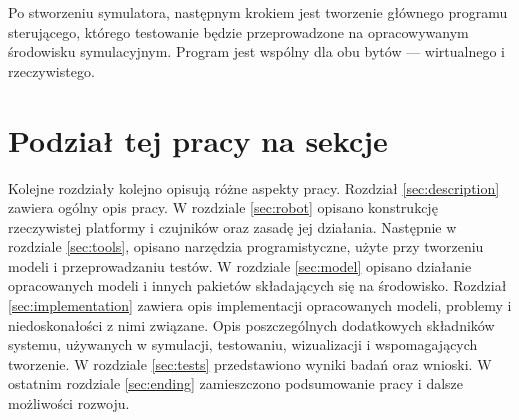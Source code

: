 	Po stworzeniu symulatora, następnym krokiem jest tworzenie głównego programu sterującego, którego testowanie będzie przeprowadzone na opracowywanym środowisku symulacyjnym.
	Program jest wspólny dla obu bytów --- wirtualnego i rzeczywistego.

\section{Podział tej pracy na sekcje}
	Kolejne rozdziały kolejno opisują różne aspekty pracy.
	Rozdział \ref{sec:description} zawiera ogólny opis pracy.
	W rozdziale \ref{sec:robot} opisano konstrukcję rzeczywistej platformy i czujników oraz zasadę jej działania.
	Następnie w rozdziale \ref{sec:tools}, opisano narzędzia programistyczne, użyte przy tworzeniu modeli i przeprowadzaniu testów.
	W rozdziale \ref{sec:model} opisano działanie opracowanych modeli i innych pakietów składających się na środowisko.
	Rozdział \ref{sec:implementation} zawiera opis implementacji opracowanych modeli, problemy i niedoskonałości z nimi związane. Opis poszczególnych dodatkowych składników systemu, używanych w symulacji, testowaniu, wizualizacji i wspomagających tworzenie.
	W rozdziale \ref{sec:tests} przedstawiono wyniki badań oraz wnioski.
	W ostatnim rozdziale \ref{sec:ending} zamieszczono podsumowanie pracy i dalsze możliwości rozwoju.
